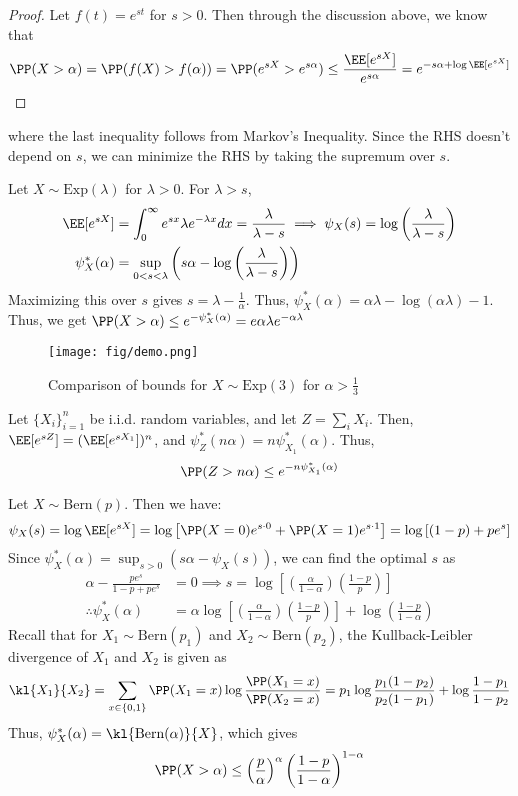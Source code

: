 \begin{proof}
Let $f(t) = e^{st}$ for $s > 0$. Then through the discussion above, we know that 
\[
\PP(X > \alpha) = \PP(f(X) > f(\alpha)) = \PP(e^{sX} > e^{s\alpha}) \leq \frac{\EE[e^{sX}]}{e^{s\alpha}} = e^{-s\alpha + \log \EE[e^{sX}]}
\]
\end{proof}
where the last inequality follows from Markov's Inequality. Since the RHS doesn't depend on $s$, we can minimize the RHS by taking the supremum over $s$.
\begin{eg}
Let $X \sim \text{Exp}(\lambda)$ for $\lambda > 0$. For $\lambda > s$,
\begin{align*}
    \EE[e^{sX}] &= \int_0^\infty e^{sx}\lambda e^{-\lambda x} dx = \frac{\lambda}{\lambda - s} \implies \psi_X(s) = \log\left(\frac{\lambda}{\lambda - s}\right) \\
    \psi_X^*(\alpha) &= \sup_{0 < s <\lambda} \left(s\alpha - \log\left(\frac{\lambda}{\lambda - s}\right) \right)
\end{align*}
Maximizing this over $s$ gives $s = \lambda - \frac{1}{\alpha}$. Thus, $\psi_X^*(\alpha) = \alpha \lambda - \log (\alpha \lambda) - 1$. Thus, we get
$\PP(X > \alpha) \leq e^{-\psi_X^*(\alpha)} = e\alpha\lambda e^{-\alpha \lambda}$
\begin{figure}[H]
    \centering
    \texttt{[image: fig/demo.png]}
    \caption{Comparison of bounds for $X\sim\text{Exp}(3)$ for $\alpha > \frac{1}{3}$}
\end{figure}
\end{eg}
\begin{corollary}
Let $\{X_i\}_{i=1}^n$ be i.i.d. random variables, and let $Z = \sum_i X_i$. Then, $\EE[e^{sZ}] = (\EE[e^{sX_1}])^n$, and $\psi_Z^*(n\alpha) = n\psi_{X_1}^*(\alpha)$. Thus,
\begin{equation}
    \PP(Z > n\alpha) \leq e^{-n\psi_{X_1}^* (\alpha)}
\end{equation}
\end{corollary}
\begin{hw}
Let $X \sim \text{Bern}(p)$. Then we have:
\[
\psi_X(s) = \log \EE[e^{sX}] = \log\left[\PP(X=0)e^{s \cdot 0} + \PP(X=1)e^{s \cdot 1}\right] = \log\left[ (1-p) + pe^s\right]
\]
Since $\psi_X^*(\alpha) = \sup_{s > 0} \left( s\alpha - \psi_X(s)\right)$, we can find the optimal $s$ as
\begin{align*}
    \alpha - \frac{pe^s}{1-p+pe^s} &= 0 \implies s = \log\left[\left(\frac{\alpha}{1-\alpha}\right) \left(\frac{1-p}{p}\right)\right] \\
\therefore \psi_X^*(\alpha) &=\alpha\log\left[\left(\frac{\alpha}{1-\alpha}\right) \left(\frac{1-p}{p}\right)\right] + \log\left(\frac{1-p}{1-\alpha}\right)
\end{align*}
Recall that for $X_1 \sim \text{Bern}(p_1)$ and $X_2 \sim \text{Bern}(p_2)$, the  Kullback-Leibler divergence of $X_1$ and $X_2$ is given as
\[
\kl{X_1}{X_2} = \sum_{x \in \{0,1\}} \PP(X_1 = x) \log\frac{\PP(X_1=x)}{\PP(X_2=x)} = p_1 \log\frac{p_1(1-p_2)}{p_2(1-p_1)} + \log\frac{1-p_1}{1-p_2}
\]
Thus, $\psi_X^*(\alpha) = \kl{\text{Bern}(\alpha)}{X}$, which gives 
\[
\PP(X > \alpha) \leq \left(\frac{p}{\alpha}\right)^{\alpha} \left(\frac{1-p}{1-\alpha}\right)^{1-\alpha}
\]
\end{hw}
